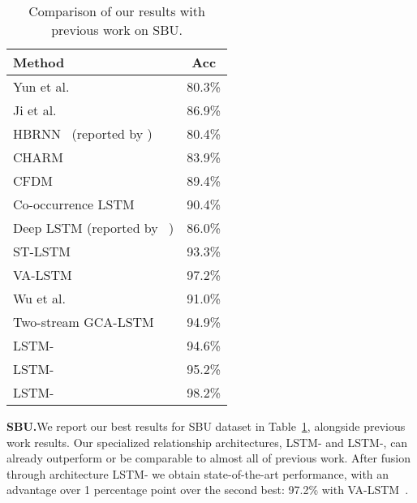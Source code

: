 \documentclass[journal,twoside]{IEEEtran}
\renewcommand{\arraystretch}{1.2}
\begin{document}
\begin{table}[ht]
	\begin{center}
	\setlength{\tabcolsep}{2em}
	\renewcommand{\arraystretch}{1.4} \caption{Comparison of our results with previous work on SBU.}
	\begin{tabular}{lc}
		\toprule
		\textbf{Method}                                   & \textbf{Acc} \\ \midrule
		Yun et al.~\cite{Yun2012}                         & 80.3\% \\ 
		Ji et al.~\cite{Ji2014}                           & 86.9\% \\ 
		HBRNN~\cite{Du2015} (reported by \cite{Zhu2016a}) & 80.4\% \\ 
		CHARM ~\cite{Li2015}                              & 83.9\% \\ 
		CFDM~\cite{Ji2015}                                & 89.4\% \\ 
		Co-occurrence LSTM~\cite{Zhu2016a}                & 90.4\% \\ 
		Deep LSTM (reported by ~\cite{Zhu2016a})          & 86.0\% \\ 
		ST-LSTM~\cite{Liu2016a}                           & 93.3\% \\ 
		VA-LSTM~\cite{Zhang2017}                          & 97.2\% \\ 
		Wu et al.~\cite{Wu2018a}                          & 91.0\% \\ 
		Two-stream GCA-LSTM~\cite{Liu2018}                & 94.9\% \\
		\midrule
		LSTM-														& 94.6\% \\ 
		LSTM-														& 95.2\% \\ 
		LSTM-                   & 98.2\% \\
		\bottomrule
	\end{tabular}
	\label{tab:sbu_sota}
	\end{center}
\end{table}



\textbf{SBU.}\quad We report our best results for SBU dataset in Table~\ref{tab:sbu_sota}, alongside previous work results. 
Our specialized relationship architectures, LSTM- and LSTM-, can already outperform or be comparable to almost all of previous work.
After fusion through architecture LSTM- we obtain state-of-the-art performance, with an advantage over 1 percentage point over the second best: 97.2\% with VA-LSTM~\cite{Zhang2017}.
\end{document}
